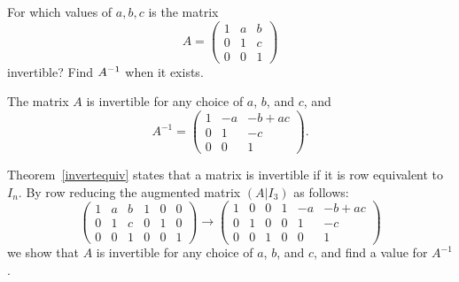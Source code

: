 \documentclass{ximera}
\begin{document}
\begin{exercise} \label{c4.9.6}
For which values of $a,b,c$ is the matrix
\[
A =\left(\begin{array}{rrr} 1 & a & b\\ 0 & 1 & c\\ 0 & 0 & 1
\end{array}\right)
\]
invertible?  Find $A^{-1}$ when it exists.

\begin{solution}

\ans
The matrix $A$ is invertible for any choice of $a$, $b$, and $c$, and
\[
A^{-1} = \left(\begin{array}{rrc} 1 & -a & -b + ac \\ 0 & 1 & -c 
\\ 0 & 0 & 1 \end{array}\right).
\]

\soln Theorem~\ref{invertequiv} states that a matrix is invertible if
it is row equivalent to $I_n$.  By row reducing the augmented matrix
$(A|I_3)$ as follows:
\[
\left(\begin{array}{rrr|rrr} 1 & a & b & 1 & 0 & 0 \\
0 & 1 & c & 0 & 1 & 0 \\ 0 & 0 & 1 & 0 & 0 & 1
\end{array}\right) \rightarrow \left(\begin{array}{rrr|rrc}
1 & 0 & 0 & 1 & -a & -b + ac \\ 0 & 1 & 0 & 0 & 1 & -c \\
0 & 0 & 1 & 0 & 0 & 1 \end{array}\right)
\]
we show that $A$ is invertible for any choice of $a$, $b$, and
$c$, and find a value for $A^{-1}$.

\end{solution}
\end{exercise}


\CEXER
\end{document}
